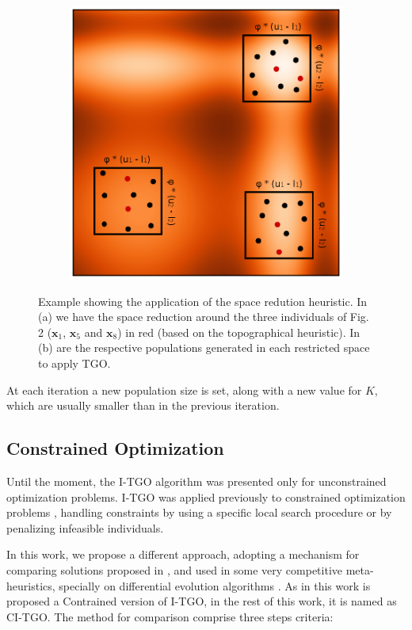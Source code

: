 \begin{figure}[tp]
\begin{subfigure}{.5\textwidth}
  \includegraphics[width=1.1\linewidth]{fig_3.eps}
  \caption{}
  \label{fig:SpaceReduction-b}
\end{subfigure}
\caption{Example showing the application of the space redution heuristic. In (a) we have the space reduction around the three individuals of Fig. 2 ($\bm{x}_1$, $\bm{x}_5$ and $\bm{x}_8$) in red (based on the topographical heuristic). In (b) are the respective populations generated in each restricted space to apply TGO.}\label{fig:SpaceReduction}
\end{figure}


At each iteration a new population size is set, along with a new value for $K$, which are usually smaller than in the previous iteration.


\subsection{Constrained Optimization}

Until the moment, the I-TGO algorithm was presented only for unconstrained optimization problems. I-TGO was applied previously to constrained optimization problems \citep{ITGO2, ITGO3}, handling constraints by using a specific local search procedure or by penalizing infeasible individuals.

In this work, we propose a different approach, adopting a mechanism for comparing solutions proposed in \cite{ConHandling}, and used in some very competitive meta-heuristics, specially on differential evolution algorithms \citep{DE1, DE2, DE3}. As in this work is proposed a Contrained version of I-TGO, in the rest of this work, it is named as CI-TGO. The method for comparison comprise three steps criteria:

